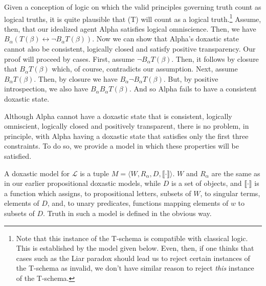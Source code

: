 Given a conception of logic on which the valid principles governing truth count as logical truths, it is quite plausible that (T) will count as a logical truth.\footnote{Note that this instance of the T-schema is compatible with classical logic. This is established by the model given below. Even, then, if one thinks that cases such as the Liar paradox should lead us to reject certain instances of the T-schema as invalid, we don't have similar reason to reject \textit{this} instance of the T-schema.}
Assume, then, that our idealized agent Alpha satisfies logical omniscience.
Then, we have $B_\alpha(T(\beta) \leftrightarrow \lnot B_\alpha T(\beta))$.
Now we can show that Alpha's doxastic state cannot also be consistent, logically closed and satisfy positive transparency.
Our proof will proceed by cases.
First, assume $\lnot B_\alpha T(\beta)$.
Then, it follows by closure that  $B_\alpha T(\beta)$ which, of course, contradicts our assumption.
Next, assume $B_\alpha T(\beta)$.
Then, by closure we have $B_\alpha \lnot B_\alpha T(\beta)$.
But, by positive introspection, we also have $B_\alpha B_\alpha T(\beta)$.
And so Alpha fails to have a consistent doxastic state.

Although Alpha cannot have a doxastic state that is consistent, logically omniscient,  logically closed and positively transparent, there is no problem, in principle, with Alpha having a doxastic state that satisfies only the first three constraints. 
To do so, we provide a model in which these properties will be satisfied. 

A doxastic model for $\mathcal{L}$ is a tuple $M = \langle W, R_\alpha, D, \llbracket \cdot \rrbracket \rangle$.
$W$ and $R_\alpha$ are the same as in our earlier propositional doxastic models, while $D$ is a set of objects, and $\llbracket \cdot \rrbracket$ is a function which assigns, to propositional letters, subsets of $W$, to singular terms, elements of $D$, and, to unary predicates, functions mapping elements of $w$ to subsets of $D$.
Truth in such a model is defined in the obvious way.

